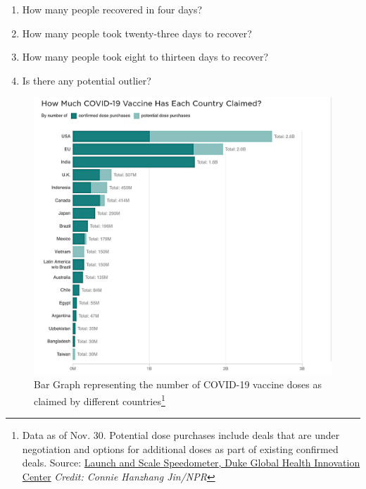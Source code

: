 \documentclass[a4paper, 11pt]{article}
\begin{document}
\begin{enumerate}[font=\bfseries]
\begin{figure}
\begin{minipage}{\linewidth}
						\label{Bar_Cancer}
					\end{minipage}
				\end{figure}
				\begin{enumerate}[label=\alph*), itemsep=0.5ex]
					\item How many people recovered in four days?
					\item How many people took twenty-three days to recover?
					\item How many people took eight to thirteen days to recover?
					\item Is there any potential outlier?
				\end{enumerate}
				\begin{figure}[b!]
					\begin{minipage}{\linewidth}
						\includegraphics[width=\linewidth]{Vaccine_Cancer.png}
						\caption{Bar Graph representing the number of COVID-19 vaccine doses as claimed by different countries\protect\footnote{Data as of Nov. 30. Potential dose purchases include deals that are under negotiation and options for additional doses as part of existing confirmed deals. Source: \href{https://launchandscalefaster.org/COVID-19}{Launch and Scale Speedometer, Duke Global Health Innovation Center} \emph{Credit: Connie Hanzhang Jin/NPR}}}
						\label{Vaccine_cancer}
					\end{minipage}
				\end{figure}

\end{enumerate}
\end{document}
